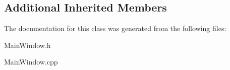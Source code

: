 \subsection*{Additional Inherited Members}


The documentation for this class was generated from the following files\+:\begin{DoxyCompactItemize}
\item 
Main\+Window.\+h\item 
Main\+Window.\+cpp\end{DoxyCompactItemize}
